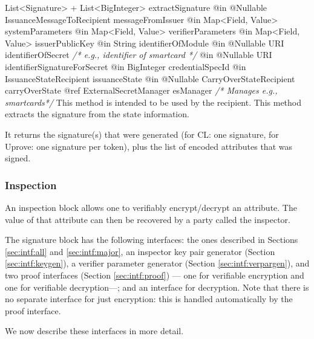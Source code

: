       \begin{method}
      {List<Signature> + List<BigInteger>}
      {extractSignature}
      {
        {@in @Nullable IssuanceMessageToRecipient messageFromIssuer}
        {@in Map<Field, Value> systemParameters}
        {@in Map<Field, Value> verifierParameters}
        {@in Map<Field, Value> issuerPublicKey}
        {@in String identifierOfModule}
        {@in @Nullable URI identifierOfSecret \textrm{\emph{/* e.g., identifier of smartcard */}}}
        {@in @Nullable URI identifierSignatureForSecret}
        {@in BigInteger credentialSpecId}
        {@in IssuanceStateRecipient issuanceState}
        {@in @Nullable CarryOverStateRecipient carryOverState}
        {@ref ExternalSecretManager esManager \textrm{\emph{/* Manages e.g., smartcards*/}}}
      }
      This method is intended to be used by the recipient.
      This method extracts the signature from the state information.

      It returns the signature(s) that were generated (for CL: one signature,
      for Uprove: one signature per token), plus the list of encoded attributes
      that was signed.
      \end{method}

    \subsubsection{Inspection}

    An inspection block allows one to verifiably encrypt/decrypt an attribute.
    The value of that attribute can then be recovered by
    a party called the inspector.

    The signature block has the following interfaces:
    the ones described in Sections \ref{sec:intf:all} and \ref{sec:intf:major},
    an inspector key pair generator (Section \ref{sec:intf:keygen}),
    a verifier parameter generator (Section \ref{sec:intf:verpargen}),
    and two proof interfaces (Section \ref{sec:intf:proof}) --- one for
    verifiable encryption and one for verifiable decryption---;
    and an interface for decryption.
    Note that there is no separate interface for just encryption: this is handled automatically by the proof interface.

    We now describe these interfaces in more detail.

